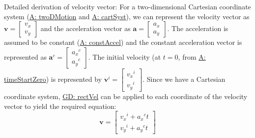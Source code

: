 \documentclass[12pt]{article}
\begin{document}
Detailed derivation of velocity vector:
For a two-dimensional Cartesian coordinate system (\hyperref[twoDMotion]{A: twoDMotion} and \hyperref[cartSyst]{A: cartSyst}), we can represent the velocity vector as $\mathbf{v}=\begin{bmatrix}
{v_{x}}\\
{v_{y}}
\end{bmatrix}$ and the acceleration vector as $\mathbf{a}=\begin{bmatrix}
{a_{x}}\\
{a_{y}}
\end{bmatrix}$. The acceleration is assumed to be constant (\hyperref[constAccel]{A: constAccel}) and the constant acceleration vector is represented as ${\mathbf{a}^{c}}=\begin{bmatrix}
{{a_{x}}^{c}}\\
{{a_{y}}^{c}}
\end{bmatrix}$. The initial velocity (at $t=0$, from \hyperref[timeStartZero]{A: timeStartZero}) is represented by ${\mathbf{v}^{i}}=\begin{bmatrix}
{{v_{x}}^{i}}\\
{{v_{y}}^{i}}
\end{bmatrix}$. Since we have a Cartesian coordinate system, \hyperref[GD:rectVel]{GD: rectVel} can be applied to each coordinate of the velocity vector to yield the required equation:
\begin{displaymath}
\mathbf{v}=\begin{bmatrix}
{{v_{x}}^{i}}+{{a_{x}}^{c}} t\\
{{v_{y}}^{i}}+{{a_{y}}^{c}} t
\end{bmatrix}
\end{displaymath}
\par~
\end{document}
